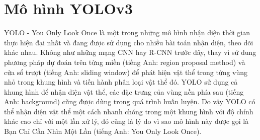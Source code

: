 \section{Mô hình YOLOv3}
YOLO - You Only Look Once\cite{redmod:2016:yolo} là một trong những mô hình nhận diện thời gian thực hiện đại nhất và đang được sử dụng cho nhiều bài toán nhận diện, theo dõi khác nhau. Không như những mạng CNN hay R-CNN trước đây, thay vì sử dung phương pháp dự đoán trên từng miền (tiếng Anh: region proposal method) và cửa sổ trượt (tiếng Anh: sliding window) để phát hiện vật thể trong từng vùng nhỏ trong khung hình và tiến hành phân loại vật thể đó. YOLO sử dụng cả khung hình để nhận diện vật thể, các đặc trưng của vùng nền phía sau (tiếng Anh: background) cũng được dùng trong quá trình huấn luyện. Do vậy YOLO có thể nhận diện vật thể một cách nhanh chóng trong một khung hình với độ chính khác cao chỉ với một lần xử lý, đó cũng là lý do vì sao mô hình này được gọi là Bạn Chỉ Cần Nhìn Một Lần (tiếng Anh: You Only Look Once).
